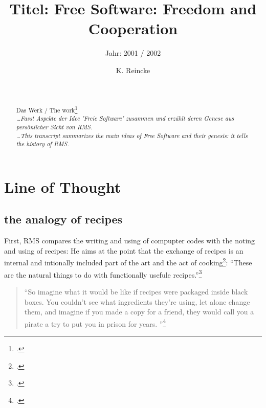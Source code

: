 \documentclass[DIV=calc,BCOR=5mm,11pt,headings=small,oneside,abstract=true, toc=bib]{scrartcl}
\begin{document}

\titlehead{Literaturexzerpt}
\subject{Autor(en): Stallman / Stallman2001a}
\title{Titel: Free Software: Freedom and Cooperation}
\subtitle{Jahr: 2001 / 2002 }
\author{K. Reincke}

\maketitle

\begin{abstract}
\noindent
\cite[(in:)][]{StaGay2002a} \\
\noindent
\cite[(ist:)][]{Stallman2001a} \\
Das Werk / The work\footcite[][]{Stallman2001a} \\
\noindent \itshape
\ldots  Fasst Aspekte der Idee 'Freie Software' zusammen und erzählt deren
Genese aus persönlicher Sicht von RMS.
\\
\noindent
\ldots This transcript summarizes the main ideas of Free Software and their
genesis: it tells the history of RMS.
\end{abstract}
\footnotesize
\normalsize

\section{Line of Thought}

\subsection{the analogy of recipes}
First, RMS compares the writing and using of compupter codes with the noting
and using of recipes: He aims at the point that the exchange of recipes is an
internal and intionally included part of the art and the act of
cooking\footcite[cf][156]{Stallman2001a}: \enquote{These are the natural things to
do with functionally usefule recipes.}\footcite[][156]{Stallman2001a}

\begin{quote}
\enquote{So imagine what it would be like if recipes were packaged inside black
boxes. You couldn't see what ingredients they're using, let alone change them,
and imagine if you made a copy for a friend, they would call you a pirate a try
to put you in prison for years.
}\footcite[][157]{Stallman2001a}
\end{quote}
\end{document}
